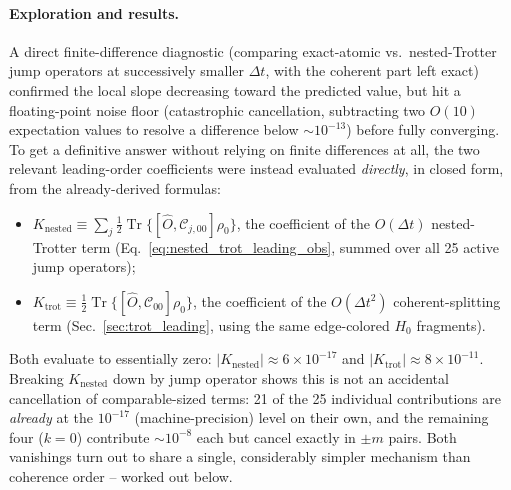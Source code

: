 \documentclass[11pt]{article}
\newcommand{\Dt}{\Delta t}
\newcommand{\calC}{\mathcal{C}}
\DeclareMathOperator{\Tr}{Tr}
\begin{document}
\paragraph{Exploration and results.} A direct finite-difference diagnostic (comparing exact-atomic vs.\ nested-Trotter jump operators at successively smaller $\Dt$, with the coherent part left exact) confirmed the local slope decreasing toward the predicted value, but hit a floating-point noise floor (catastrophic cancellation, subtracting two $O(10)$ expectation values to resolve a difference below $\sim10^{-13}$) before fully converging. To get a definitive answer without relying on finite differences at all, the two relevant leading-order coefficients were instead evaluated \emph{directly}, in closed form, from the already-derived formulas:
\begin{itemize}
    \item $K_{\text{nested}} \equiv \sum_j\tfrac12\Tr\{[\hat{O},\calC_{j,00}]\rho_0\}$, the coefficient of the $O(\Dt)$ nested-Trotter term (Eq.~\eqref{eq:nested_trot_leading_obs}, summed over all 25 active jump operators);
    \item $K_{\text{trot}} \equiv \tfrac12\Tr\{[\hat{O},\calC_{00}]\rho_0\}$, the coefficient of the $O(\Dt^2)$ coherent-splitting term (Sec.~\ref{sec:trot_leading}, using the same edge-colored $H_0$ fragments).
\end{itemize}
Both evaluate to essentially zero: $|K_{\text{nested}}|\approx6\times10^{-17}$ and $|K_{\text{trot}}|\approx8\times10^{-11}$. Breaking $K_{\text{nested}}$ down by jump operator shows this is not an accidental cancellation of comparable-sized terms: 21 of the 25 individual contributions are \emph{already} at the $10^{-17}$ (machine-precision) level on their own, and the remaining four ($k=0$) contribute $\sim10^{-8}$ each but cancel exactly in $\pm m$ pairs. Both vanishings turn out to share a single, considerably simpler mechanism than coherence order -- worked out below.
\end{document}
